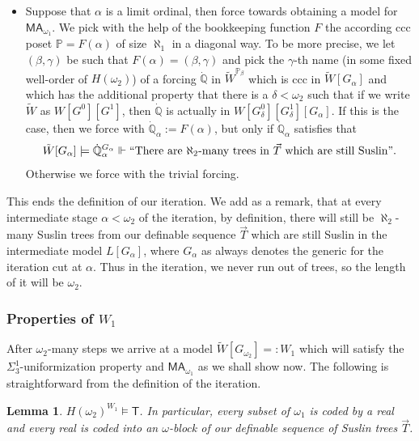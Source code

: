 \documentclass[a4paper,12pt]{article}
\newtheorem{lemma}[theorem]{Lemma}
\newcommand{\forceP}{\mathbb{P}}
\newcommand{\forceQ}{\mathbb{Q}}
\newcommand{\forceR}{\mathbb{R}}
\newcommand{\MA}{\mathsf{MA}_{\omega_1}}
\newcommand{\T}{\mathsf{T}}
\begin{document}
\begin{itemize}
In the next step we use almost disjoint forcing $\mathbb{A}_D(Y_{\alpha})$ relative to the $<_L$-least almost disjoint family of reals $D$ to code the set $Y_{\alpha}$ into one real $r_{\alpha}$. The almost disjoint coding forcing shall be our second forcing $\forceR_1$.


\item Suppose that $\alpha$ is a limit ordinal, then force towards obtaining a model for $\MA$. We pick with the help of the bookkeeping function $F$ the according ccc poset $\forceP=F(\alpha)$ of size $\aleph_1$ in a diagonal way. To be more precise, we let $(\beta,\gamma)$ be such that $F(\alpha)=(\beta,\gamma)$ and pick the $\gamma$-th name (in some fixed well-order of $H(\omega_2)$)
of a forcing $\dot{\forceQ}$ in $\tilde{W}^{\forceP_{\beta}}$ which is ccc in $\tilde{W}[G_{\alpha}]$ and which has the additional property that there is a $\delta < \omega_2$ such that if we write $\tilde{W}$ as $W[G^0][G^1]$, then $\dot{\forceQ}$ is actually in $W[G^0_{\delta}][G^1_{\delta}] [G_{\alpha}]$.
If this is the case, then we force with $\dot{\forceQ}_{\alpha}:=F(\alpha)$, but only if $\dot{\forceQ}_{\alpha}$ satisfies that \[\tilde{W}[G_{\alpha}] \models \dot{\forceQ}_{\alpha}^{G_{\alpha}} \Vdash``\text{There are $\aleph_2$-many trees in $\vec{T}$ which are still Suslin}".\]
Otherwise we force with the trivial forcing.
\end{itemize}
This ends the definition of our iteration. We add as a remark, that at every intermediate stage $\alpha< \omega_2$ of the iteration, by definition, there will still be $\aleph_2$-many Suslin trees from our definable sequence $\vec{T}$ which are still Suslin in the intermediate model $L[G_{\alpha}]$, where $G_{\alpha}$ as always denotes the generic for the iteration cut at $\alpha$. Thus in the iteration, we never run out of trees, so the length of it will be $\omega_2$. 


\subsubsection{Properties of $W_1$}
After $\omega_2$-many steps we arrive at a model $\tilde{W}[G_{\omega_2}]=:W_1$ which will satisfy the $\Sigma^1_3$-uniformization property and $\MA$ as we shall show now.
The following is straightforward from the definition of the iteration.
\begin{lemma}
 $H(\omega_2)^{W_1} \models \T$. In particular, every subset of $\omega_1$ is coded by a real and every real is coded into an $\omega$-block of our definable sequence of Suslin trees $\vec{T}$.
\end{lemma}
\end{document}
